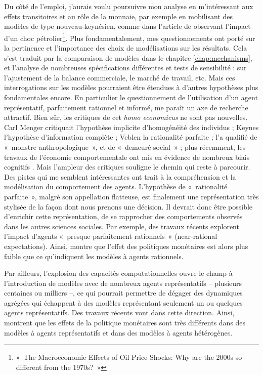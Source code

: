 Du côté de l’emploi, j’aurais voulu poursuivre mon analyse en m’intéressant aux effets transitoires et au rôle de la monnaie, par exemple en mobilisant des modèles de type nouveau-keynésien, comme dans l'article de \citet{Blanchard2007} observant l'impact d'un choc pétrolier\footnote{«~The Macroeconomic Effects of Oil Price Shocks: Why are the 2000s so different from the 1970s?~»}.
Plus fondamentalement, mes questionnements ont porté sur la pertinence et l’importance des choix de modélisations sur les résultats. Cela s’est traduit par la comparaison de modèles dans le chapitre \ref{chap:mechanisms}, et l’analyse de nombreuses spécifications différentes et tests de sensibilité : sur l’ajustement de la balance commerciale, le marché de travail, etc. 
Mais ces interrogations sur les modèles pourraient être étendues à d'autres hypothèses plus fondamentales encore. En particulier le questionnement de l’utilisation d’un agent représentatif, parfaitement rationnel et informé, me paraît un axe de recherche attractif. Bien sûr, les critiques de cet \textit{homo economicus} ne sont pas nouvelles. Carl Menger critiquait l’hypothèse implicite d’homogénéité des individus ; Keynes l’hypothèse d’information complète ; Veblen la rationalité parfaite ; \citet{Bourdieu1977} l’a qualifié de «~monstre anthropologique~», et \citet{Sen2012} de «~demeuré social~» ; plus récemment, les travaux de l’économie comportementale ont mis en évidence de nombreux biais cognitifs \citep{Thaler2009,Kahneman2011}.
Mais l’ampleur des critiques souligne le chemin qui reste à parcourir. Des pistes qui me semblent intéressantes ont trait à la compréhension et la modélisation du comportement des agents. L'hypothèse de «~rationalité parfaite~», malgré son appellation flatteuse, est finalement une représentation très stylisée de la façon dont nous prenons une décision. Il devrait donc être possible d'enrichir cette représentation, de se rapprocher des comportements observés dans les autres sciences sociales. Par exemple, des travaux récents explorent l’impact d’agents «~presque parfaitement rationnels~» (near-rational expectations). Ainsi, \citet{Farhi2016} montre que l’effet des politiques monétaires est alors plus faible que ce qu’indiquent les modèles à agents rationnels.

Par ailleurs, l’explosion des capacités computationnelles ouvre le champ à l’introduction de modèles avec de nombreux agents représentatifs – plusieurs centaines ou milliers –, ce qui pourrait permettre de dégager des dynamiques agrégées qui échappent à des modèles représentant seulement un ou quelques agents représentatifs. Des travaux récents vont dans cette direction. Ainsi, \citet{Kaplan2016} montrent que les effets de la politique monétaires sont très différents dans des modèles à agents représentatifs et dans des modèles à agents hétérogènes. 

